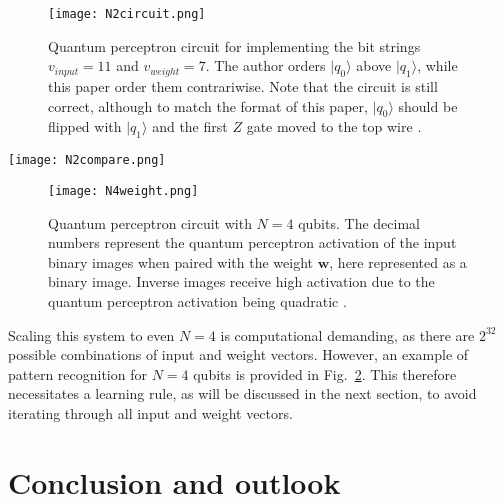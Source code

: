 \documentclass[twocolumn,superscriptaddress]{revtex4-1}
\begin{document}
\begin{figure}[t!]
\texttt{[image: N2circuit.png]}
\caption{Quantum perceptron circuit for implementing the bit strings $v_{input} = 11$ and $v_{weight} = 7$. The author orders $|q_0 \rangle$ above $|q_1 \rangle$, while this paper order them contrariwise. Note that the circuit is still correct, although to match the format of this paper, $|q_0 \rangle$ should be flipped with $|q_1 \rangle $ and the first $Z$ gate moved to the top wire \cite{Tacchino_2019}.}
\label{fig:N2circuit}
\end{figure}

\begin{figure*}[t!]
\texttt{[image: N2compare.png]}
\caption{Quantum perceptron activation for $N=2$ qubits, demonstrated in different settings. The axis $k_i$ and $k_w$ represent the binary strings of length $n=4$. The leftmost represents the ideal outcome of computing the scalar product between input and weight vectors, simulated on a classical computer. The rightmost represents the HSGS procedure. The middle represents a less optimal procedure, and has thus not been covered. The author uses different notation: $i_j$ instead of $x^{(j)}_i$, $k_i$ instead of $v_{input}$, and $k_w$ instead of $v_{weight}$\cite{Tacchino_2019}.}
\label{fig:N2compare}
\end{figure*}

\begin{figure}[t!]
\texttt{[image: N4weight.png]}
\caption{Quantum perceptron circuit with $N=4$ qubits. The decimal numbers represent the quantum perceptron activation of the input binary images when paired with the weight $\bm{w}$, here represented as a binary image. Inverse images receive high activation due to the quantum perceptron activation being quadratic \cite{Tacchino_2019}.}
\label{fig:N4weight}
\end{figure}

Scaling this system to even $N = 4$ is computational demanding, as there are $2^{32}$ possible combinations of input and weight vectors. However, an example of pattern recognition for $N=4$ qubits is provided in Fig.~\ref{fig:N4weight}. This therefore necessitates a learning rule, as will be discussed in the next section, to avoid iterating through all input and weight vectors.

\section{Conclusion and outlook} \label{conclusion}
\end{document}
